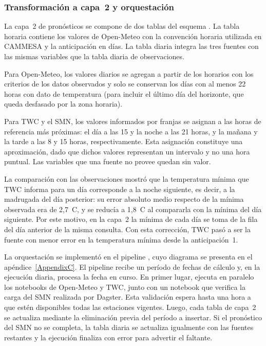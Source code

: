 \subsubsection{Transformación a capa~2 y orquestación}

La capa~2 de pronósticos se compone de dos tablas del esquema . La tabla horaria  contiene los valores de Open-Meteo con la convención horaria utilizada en CAMMESA y la anticipación en días. La tabla diaria  integra las tres fuentes con las mismas variables que la tabla diaria de observaciones. 

Para Open-Meteo, los valores diarios se agregan a partir de los horarios con los criterios de los datos observados y solo se conservan los días con al menos 22 horas con dato de temperatura (para incluir el último día del horizonte, que queda desfasado por la zona horaria). 

Para TWC y el SMN, los valores informados por franjas se asignan a las horas de referencia más próximas: el día a las 15 y la noche a las 21 horas, y la mañana y la tarde a las 8 y 15 horas, respectivamente. Esta asignación constituye una aproximación, dado que dichos valores representan un intervalo y no una hora puntual. Las variables que una fuente no provee quedan sin valor.

La comparación con las observaciones mostró que la temperatura mínima que TWC informa para un día corresponde a la noche siguiente, es decir, a la madrugada del día posterior: su error absoluto medio respecto de la mínima observada era de 2,7~\textdegree C, y se reducía a 1,8~\textdegree C al compararla con la mínima del día siguiente. Por este motivo, en la capa~2 la mínima de cada día se toma de la fila del día anterior de la misma consulta. Con esta corrección, TWC pasó a ser la fuente con menor error en la temperatura mínima desde la anticipación~1.

La orquestación se implementó en el pipeline , cuyo diagrama se presenta en el apéndice~\ref{AppendixC}. El pipeline recibe un período de fechas de cálculo y, en la ejecución diaria, procesa la fecha en curso. En primer lugar, ejecuta en paralelo los notebooks de Open-Meteo y TWC, junto con un notebook que verifica la carga del SMN realizada por Dagster. Esta validación espera hasta una hora a que estén disponibles todas las estaciones vigentes. Luego, cada tabla de capa~2 se actualiza mediante la eliminación previa del período a insertar. Si el pronóstico del SMN no se completa, la tabla diaria se actualiza igualmente con las fuentes restantes y la ejecución finaliza con error para advertir el faltante.

